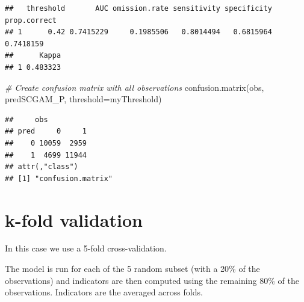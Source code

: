 \documentclass[
]{book}
\newenvironment{Shaded}{\begin{snugshade}}{\end{snugshade}}
\newcommand{\AttributeTok}[1]{\textcolor[rgb]{0.77,0.63,0.00}{#1}}
\newcommand{\CommentTok}[1]{\textcolor[rgb]{0.56,0.35,0.01}{\textit{#1}}}
\newcommand{\DecValTok}[1]{\textcolor[rgb]{0.00,0.00,0.81}{#1}}
\newcommand{\FunctionTok}[1]{\textcolor[rgb]{0.00,0.00,0.00}{#1}}
\newcommand{\NormalTok}[1]{#1}
\newcommand{\OtherTok}[1]{\textcolor[rgb]{0.56,0.35,0.01}{#1}}
\newcommand{\SpecialCharTok}[1]{\textcolor[rgb]{0.00,0.00,0.00}{#1}}
\begin{document}
\begin{verbatim}
##   threshold       AUC omission.rate sensitivity specificity prop.correct
## 1      0.42 0.7415229     0.1985506   0.8014494   0.6815964    0.7418159
##      Kappa
## 1 0.483323
\end{verbatim}

\begin{Shaded}
\begin{Highlighting}[]
\CommentTok{\# Create confusion matrix with all observations}
\FunctionTok{confusion.matrix}\NormalTok{(obs, predSCGAM\_P, }\AttributeTok{threshold=}\NormalTok{myThreshold)}
\end{Highlighting}
\end{Shaded}

\begin{verbatim}
##     obs
## pred     0     1
##    0 10059  2959
##    1  4699 11944
## attr(,"class")
## [1] "confusion.matrix"
\end{verbatim}

\hypertarget{k-fold-validation}{%
\section{k-fold validation}\label{k-fold-validation}}

In this case we use a 5-fold cross-validation.

\begin{Shaded}
\end{Shaded}

The model is run for each of the 5 random subset (with a 20\% of the observations) and indicators are then computed using the remaining 80\% of the observations. Indicators are the averaged across folds.
\end{document}
